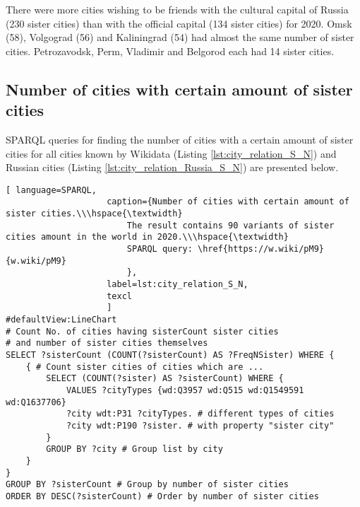 There were more cities wishing to be friends with the cultural capital of Russia (230 sister cities) than with the official capital (134 sister cities) for 2020. Omsk (58), Volgograd (56) and Kaliningrad (54) had almost the same number of sister cities. Petrozavodsk, Perm, Vladimir and Belgorod each had 14 sister cities.

\subsection{Number of cities with certain amount of sister cities}

SPARQL queries for finding the number of cities with a certain amount of sister cities for all cities known by Wikidata (Listing \ref{lst:city_relation_S_N}) and Russian cities (Listing \ref{lst:city_relation_Russia_S_N}) are presented below.

\begin{lstlisting}[ language=SPARQL, 
                    caption={Number of cities with certain amount of sister cities.\\\hspace{\textwidth}
                        The result contains 90 variants of sister cities amount in the world in 2020.\\\hspace{\textwidth}
                        SPARQL query: \href{https://w.wiki/pM9}{w.wiki/pM9}
                        },
                    label=lst:city_relation_S_N,
                    texcl 
                    ]
#defaultView:LineChart
# Count No. of cities having sisterCount sister cities 
# and number of sister cities themselves
SELECT ?sisterCount (COUNT(?sisterCount) AS ?FreqNSister) WHERE {                                                                         
	{ # Count sister cities of cities which are ...
		SELECT (COUNT(?sister) AS ?sisterCount) WHERE {        
			VALUES ?cityTypes {wd:Q3957 wd:Q515 wd:Q1549591 wd:Q1637706}
			?city wdt:P31 ?cityTypes. # different types of cities
			?city wdt:P190 ?sister. # with property "sister city"
		}
		GROUP BY ?city # Group list by city
	}
}
GROUP BY ?sisterCount # Group by number of sister cities                                     
ORDER BY DESC(?sisterCount) # Order by number of sister cities 
\end{lstlisting}%


